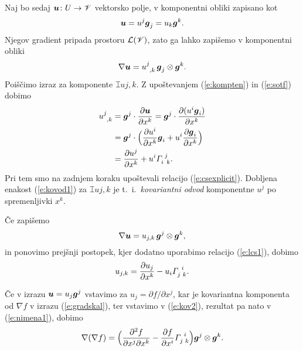 Naj bo sedaj $\boldsymbol u\colon U\to\mathscr V$ vektorsko polje, v komponentni obliki
zapisano kot
\[ \boldsymbol u=u^j\boldsymbol g_j=u_k\boldsymbol g^k. \]
Njegov gradient pripada prostoru $\mathcal L(\mathscr V)$, zato ga lahko zapišemo v komponentni obliki
\begin{equation} \label{e:gradukomp}
	\nabla\vek{u}=\topbot{u}{j}{,k}\,\vek{g}_j\otimes\vek{g}^k.
\end{equation}
Poiščimo izraz za komponente $\topbot{u}{j}{,k}$. Z upoštevanjem
(\ref{e:kompten}) in (\ref{e:sotf}) dobimo
\begin{align}
	\topbot{u}{j}{,k}&=\vek{g}^j\cdot\frac{\partial\vek{u}}{\partial x^k}=
	\vek{g}^j\cdot\frac{\partial(u^i\vek{g}_i)}{\partial x^k} \nonumber \\
	&=\vek{g}^j\cdot\Big(\frac{\partial u^i}{\partial x^k}\vek{g}_i+
	u^i\frac{\partial\vek{g}_i}{\partial x^k}\Big) \nonumber \\
	&=\frac{\partial u^j}{\partial x^k}+u^i\cs{i}{j}{k}. \label{e:kovod1}
\end{align}
Pri tem smo na zadnjem koraku upoštevali relacijo (\ref{e:csexplicit}). Dobljena enakost (\ref{e:kovod1})
za $\topbot{u}{j}{,k}$ je t.~i.~\emph{kovariantni odvod} komponentne $u^j$ po spremenljivki $x^k$.

Če zapišemo
\begin{equation} \label{e:nimena1}
	\nabla\boldsymbol u=u_{j,k}\,\boldsymbol g^j\otimes\boldsymbol g^k,
\end{equation}
in ponovimo prejšnji postopek, kjer dodatno uporabimo relacijo (\ref{e:lcs1}), dobimo
\begin{equation} \label{e:kov2}
	u_{j,k}=\frac{\partial u_j}{\partial x^k}-u_i\cs{j}{i}{k}.
\end{equation}
\begin{primer}
	Če v izrazu $\boldsymbol u=u_j\boldsymbol g^j$ vstavimo za $u_j=\partial f/\partial x^j$,
	kar je kovariantna komponenta od $\nabla f$ v izrazu (\ref{e:gradskal}), ter vstavimo v
	(\ref{e:kov2}), rezultat pa nato v (\ref{e:nimena1}), dobimo
	\begin{equation} \label{e:dvagrad}
		\nabla(\nabla f)=\Big(\frac{\partial^2 f}{\partial x^j\partial x^k}-
		\frac{\partial f}{\partial x^i}\cs{j}{i}{k}\Big)\vek{g}^j\otimes\vek{g}^k.
	\end{equation}
\end{primer}


